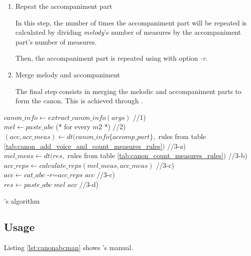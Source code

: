 \begin{enumerate}
\begin{enumerate}
      \item Repeat the accompaniment part

      In this step, the number of times the accompaniment part will be repeated is calculated by
      dividing \emph{melody}'s number of measures by the accompaniment part's number of measures.

      Then, the accompaniment part is repeated using \catabc{} with option \emph{-r}.

      \item Merge melody and accompaniment

      The final step consists in merging the melodic and accompaniment parts to form the canon. This
      is achieved through \pasteabc{}.
    \end{enumerate}
\end{enumerate}

\begin{algorithm}[h]
  $canon\_info \gets extract\_canon\_info(args)$ \hfill //1)\\
  $mel \gets paste\_abc $ (* for every $m2$ *) \hfill //2)\\

  $(acc, acc\_meas) \gets dt(canon\_info\{accomp\_part\},$ rules from table \ref{tab:canon_add_voice_and_count_measures_rules}$)$ \hfill //3-a)\\
  $mel\_meas \gets dt(res,$ rules from table \ref{tab:canon_count_measures_rules}$)$ \hfill //3-b)\\
  $acc\_reps \gets calculate\_reps(mel\_meas, acc\_meas)$ \hfill //3-c)\\
  $acc \gets cat\_abc$ -$r$=$acc\_reps$ $acc$ \hfill //3-c)\\
  $res \gets paste\_abc$ $mel$ $acc$ \hfill //3-d)\\
  \caption{\canonabc{}'s algorithm}
  \label{alg:canonabc}
\end{algorithm}

\subsection*{Usage}

Listing \ref{lst:canonabcman} shows \canonabc{}'s manual.\\

